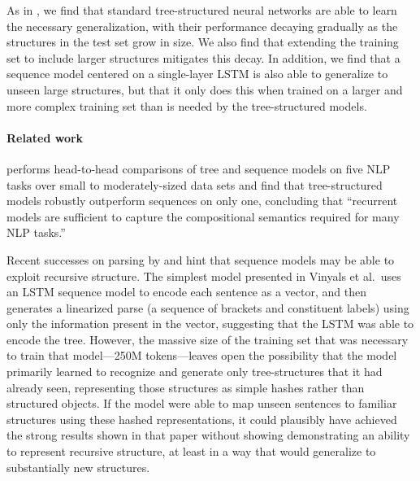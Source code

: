 As in , we find that standard tree-structured neural networks are able to learn the necessary generalization, with their performance decaying gradually as the structures in the test set grow in size. We also find that extending the training set to include larger structures mitigates this decay. In addition, we find that a sequence model centered on a single-layer LSTM is also able to generalize to unseen large structures, but that it only does this when trained on a larger and more complex training set than is needed by the tree-structured models. 

\paragraph{Related work}
 performs head-to-head comparisons of tree and sequence models on five NLP tasks over small to moderately-sized data sets and find that tree-structured models robustly outperform sequences on only one, concluding that ``recurrent models are sufficient to capture the compositional semantics required for many NLP tasks.''

Recent successes on parsing by  and  hint that sequence models may be able to exploit recursive structure. The simplest model presented in Vinyals et al.~uses an LSTM sequence model to encode each sentence as a vector, and then generates a linearized parse (a sequence of brackets and constituent labels) using only the information present in the vector, suggesting that the LSTM was able to encode the tree. However, the massive size of the training set that was necessary to train that model---250M tokens---leaves open the possibility that the model primarily learned to recognize and generate only tree-structures that it had already seen, representing those structures as simple hashes rather than structured objects. If the model were able to map unseen sentences to familiar structures using these hashed representations, it could plausibly have achieved the strong results shown in that paper without showing demonstrating an ability to represent recursive structure, at least in a way that would generalize to substantially new structures.
